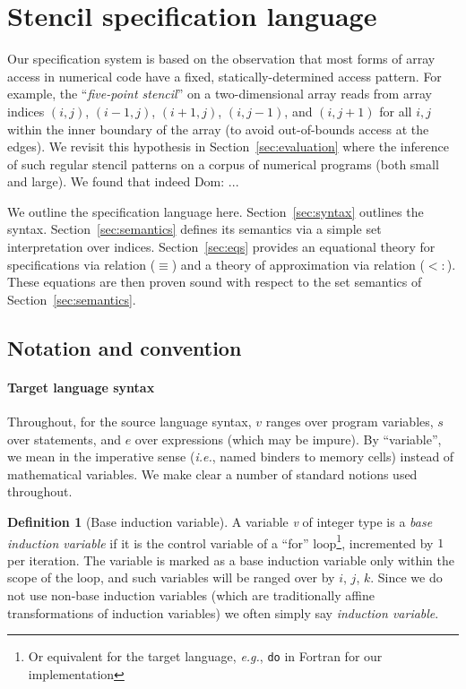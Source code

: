 \documentclass[9pt]{sigplanconf}
\newcommand{\dnote}[1]{\textcolor{darkpurple}{Dom: #1}}
\newcounter{block}
\theoremstyle{definition}
\newtheorem{definition}[block]{Definition}
\newcommand{\ie}{\emph{i.e.}}
\newcommand{\eg}{\emph{e.g.}}
\begin{document}
\section{Stencil specification language}
\label{sec:lang}

Our specification system is based on the observation
that most forms of array access in numerical code have
a fixed, statically-determined access pattern. For example, the
``\emph{five-point stencil}'' on a two-dimensional array reads from array
indices $(i, j)$, $(i-1, j)$, $(i+1, j)$, $(i, j-1)$, and $(i, j+1)$
for all $i, j$ within the inner boundary of the array (to avoid
out-of-bounds access at the edges). We revisit this hypothesis
in Section~\ref{sec:evaluation} where the inference of
such regular stencil patterns on a corpus of numerical programs (both
small and large). We found that indeed \dnote{..}.

We outline the specification language here. Section~\ref{sec:syntax}
outlines the syntax. Section~\ref{sec:semantics} defines its semantics
via a simple set interpretation over indices. Section~\ref{sec:eqs} provides an
equational theory for specifications via relation ($\equiv$) and a
theory of approximation via relation ($<:$). These equations are then
proven sound with respect to the set semantics of Section~\ref{sec:semantics}.

\subsection{Notation and convention}
\label{sec:notation}

\renewcommand*{\arraystretch}{0.8}
\paragraph{Target language syntax} Throughout, for the source language
syntax, $v$ ranges over program variables, $s$ over statements, and
$e$ over expressions (which may be impure).  By ``variable'', we mean
in the imperative sense (\ie{}, named binders to memory cells) instead
of mathematical variables. We make clear a number of standard notions
used throughout.

\begin{definition}[Base induction variable]
  A variable \textit{v} of integer type is a \emph{base induction
    variable} if it is the control variable of a ``for''
  loop\footnote{Or equivalent for the target language, \eg{},
    \texttt{do} in Fortran for our implementation}, incremented by $1$ per
iteration. The variable is marked as a base induction variable
only within the scope of the loop, and such variables will be ranged
over by $i$, $j$, $k$. Since we do not use non-base induction
variables (which are traditionally affine transformations of induction
variables) we often simply say \emph{induction variable}.
\end{definition}
\end{document}
